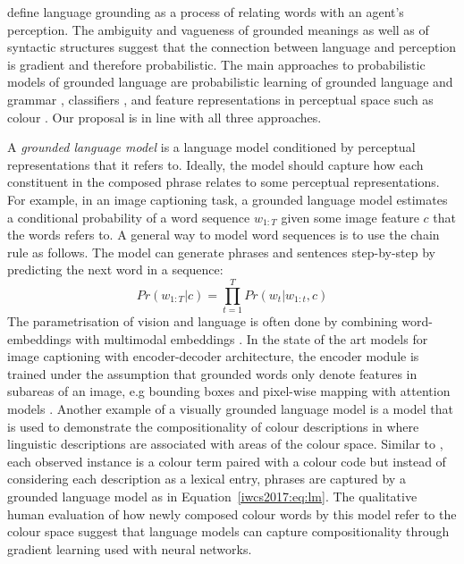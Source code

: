 \cite{harnad1990symbol,roy2005semiotic} define language grounding as a process
of relating words with an agent's perception. The ambiguity and
vagueness of grounded meanings as well as of syntactic structures suggest that the
connection between language and perception is gradient and therefore
probabilistic. The main approaches to probabilistic models of grounded language
are probabilistic learning of grounded language and grammar
\cite{roy2005towards,matuszek2012joint}, classifiers \cite{Dobnik:2009dz}, and feature representations in perceptual space such as colour \cite{mcmahan2015bayesian}. Our proposal is in line with all three approaches. 

A \emph{grounded language model} is a language model conditioned by 
perceptual representations that it refers to. Ideally, the model should capture
how each constituent in the composed phrase relates to some perceptual
representations. For example, in an image captioning task, a grounded language
model estimates a conditional probability of a word sequence
$w_{1:T}$ given some image feature $c$ that the words refers to. A
general way to model word sequences is to use the chain rule as
follows. The model can generate phrases and sentences step-by-step by predicting
the next word in a sequence:
\begin{equation}\label{iwcs2017:eq:lm}
 Pr(w_{1:T} | c) = \prod_{t=1}^{T}{Pr(w_{t} |w_{1:t}, c)}
\end{equation}
The parametrisation of vision and language is often done by
combining word-embeddings with multimodal embeddings
\cite{kiros2014unifying,socher2014grounded}.
In the state of the art models for image captioning with encoder-decoder
architecture, the encoder module is trained under the assumption
that grounded words only denote features in subareas of an image, e.g bounding
boxes \cite{karpathy2015deep} and pixel-wise mapping with attention models
\cite{xu2015show,lu2017knowing}.
Another example of a visually grounded language model is a model that is used to demonstrate
the compositionality of colour descriptions in \cite{monroe2016learning} where 
linguistic descriptions are associated with areas of the colour space. Similar to \cite{mcmahan2015bayesian},
each observed instance is a colour term paired with a colour code but instead
of considering each description as a lexical entry, phrases are captured by
a grounded language model as in Equation~\ref{iwcs2017:eq:lm}. The
qualitative human evaluation of how newly composed colour words by this model refer
to the colour space suggest that language models can capture compositionality
through gradient learning used with neural networks.

